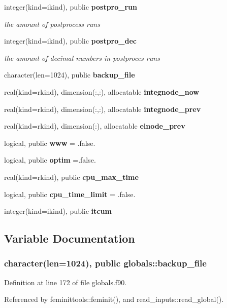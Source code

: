 \begin{DoxyCompactItemize}
\item 
integer(kind=ikind), public {\bf postpro\+\_\+run}
\begin{DoxyCompactList}\small\item\em the amount of postprocess runs \end{DoxyCompactList}\item 
integer(kind=ikind), public {\bf postpro\+\_\+dec}
\begin{DoxyCompactList}\small\item\em the amount of decimal numbers in postproces runs \end{DoxyCompactList}\item 
character(len=1024), public {\bf backup\+\_\+file}
\item 
real(kind=rkind), dimension(\+:,\+:), allocatable {\bf integnode\+\_\+now}
\item 
real(kind=rkind), dimension(\+:,\+:), allocatable {\bf integnode\+\_\+prev}
\item 
real(kind=rkind), dimension(\+:), allocatable {\bf elnode\+\_\+prev}
\item 
logical, public {\bf www} = .false.
\item 
logical, public {\bf optim} =.false.
\item 
real(kind=rkind), public {\bf cpu\+\_\+max\+\_\+time}
\item 
logical, public {\bf cpu\+\_\+time\+\_\+limit} = .false.
\item 
integer(kind=ikind), public {\bf itcum}
\end{DoxyCompactItemize}


\subsection{Variable Documentation}
\subsubsection[{backup\+\_\+file}]{\setlength{\rightskip}{0pt plus 5cm}character(len=1024), public globals\+::backup\+\_\+file}\label{namespaceglobals_a1d00e237c85f5a84f170add9a927149a}


Definition at line 172 of file globals.\+f90.



Referenced by feminittools\+::feminit(), and read\+\_\+inputs\+::read\+\_\+global().


